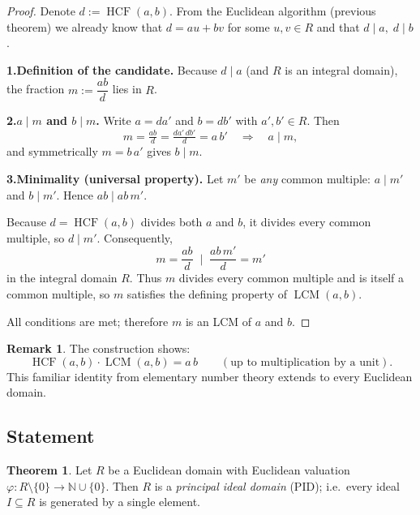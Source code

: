 \documentclass[12pt]{article}
\theoremstyle{definition} %
\newtheorem{theorem}{Theorem}
\newtheorem{remark}{Remark}
\theoremstyle{plain} %
\begin{document}
  \begin{proof}
  Denote \(d := \operatorname{HCF}(a,b)\).
  From the Euclidean algorithm (previous theorem) we already know that
  \(d = au + bv\) for some \(u,v\in R\) and that \(d\mid a,\;d\mid b\).
  
  \smallskip
  \textbf{1.\;Definition of the candidate.}
  Because \(d\mid a\) (and \(R\) is an integral domain), the fraction
  \(
     m := \dfrac{ab}{d}
  \)
  lies in \(R\).
  
  \smallskip
  \textbf{2.\;\(a\mid m\) and \(b\mid m\).}
  Write \(a = da'\) and \(b = db'\) with \(a',b'\in R\).  Then
  \[
      m = \tfrac{ab}{d} = \tfrac{da' \, db'}{d} = a \, b'
      \quad\Longrightarrow\quad
      a\mid m ,
  \]
  and symmetrically \(m = b\,a'\) gives \(b\mid m\).
  
  \smallskip
  \textbf{3.\;Minimality (universal property).}
  Let \(m'\) be \emph{any} common multiple: \(a\mid m'\) and \(b\mid m'\).
  Hence \(ab\mid ab\,m'\).
  
  Because \(d=\operatorname{HCF}(a,b)\) divides both \(a\) and \(b\),
  it divides every common multiple, so \(d\mid m'\).
  Consequently,
  \[
     m = \frac{ab}{d} \;\mid\; \frac{ab\,m'}{d} = m'
  \]
  in the integral domain \(R\).
  Thus \(m\) divides every common multiple and is itself a common multiple,
  so \(m\) satisfies the defining property of \(\operatorname{LCM}(a,b)\).
  
  \smallskip
  All conditions are met; therefore \(m\) is an LCM of \(a\) and \(b\).
  \end{proof}
  
  \begin{remark}
  The construction shows:
  \[
     \operatorname{HCF}(a,b)\cdot \operatorname{LCM}(a,b)
     = a\,b
     \qquad(\text{up to multiplication by a unit}).
  \]
  This familiar identity from elementary number theory extends to every
  Euclidean domain.
  \end{remark}
\subsection*{Statement}

\begin{theorem}
  Let \(R\) be a Euclidean domain with Euclidean valuation
  \(\varphi:R\setminus\{0\}\to\mathbb N\cup\{0\}\).
  Then \(R\) is a \emph{principal ideal domain} (PID);
  i.e.\ every ideal \(I\subseteq R\) is generated by a single element.
\end{theorem}
\end{document}
